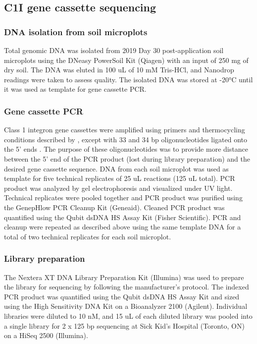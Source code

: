 \subsection{C1I gene cassette sequencing}

\subsubsection{DNA isolation from soil microplots}

Total genomic DNA was isolated from 2019 Day 30 post-application soil microplots using the DNeasy PowerSoil Kit (Qiagen) with an input of 250 mg of dry soil.
The DNA was eluted in 100 uL of 10 mM Tris-HCl, and Nanodrop readings were taken to assess quality.
The isolated DNA was stored at -20°C until it was used as template for gene cassette PCR.

\subsubsection{Gene cassette PCR}

Class 1 integron gene cassettes were amplified using primers and thermocycling conditions described by \textcite{stokesGeneCassettePCR2001}, except with 33 and 34 bp oligonucleotides ligated onto the 5’ ends \dummyfig.
The purpose of these oligonucleotides was to provide more distance between the 5’ end of the PCR product (lost during library preparation) and the desired gene cassette sequence.
DNA from each soil microplot was used as template for five technical replicates of 25 uL reactions (125 uL total).
PCR product was analyzed by gel electrophoresis and visualized under UV light.
Technical replicates were pooled together and PCR product was purified using the GenepHlow PCR Cleanup Kit (Geneaid).
Cleaned PCR product was quantified using the Qubit dsDNA HS Assay Kit (Fisher Scientific).
PCR and cleanup were repeated as described above using the same template DNA for a total of two technical replicates for each soil microplot.

\subsubsection{Library preparation}

The Nextera XT DNA Library Preparation Kit (Illumina) was used to prepare the library for sequencing by following the manufacturer’s protocol.
The indexed PCR product was quantified using the Qubit dsDNA HS Assay Kit and sized using the High Sensitivity DNA Kit on a Bioanalyzer 2100 (Agilent).
Individual libraries were diluted to 10 nM, and 15 uL of each diluted library was pooled into a single library for 2 x 125 bp sequencing at Sick Kid’s Hospital (Toronto, ON) on a HiSeq 2500 (Illumina).

